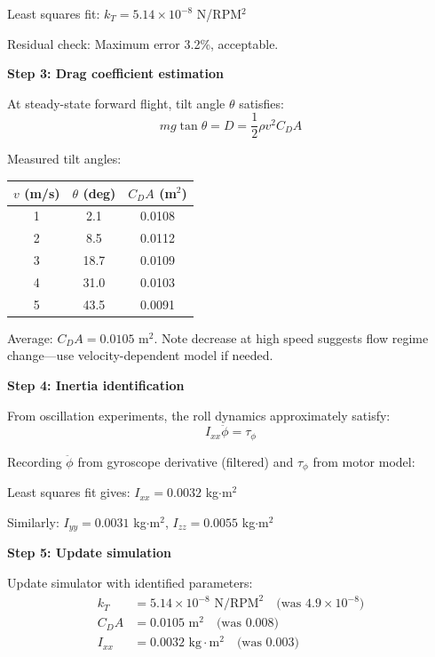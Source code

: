 \begin{example}
Least squares fit: $k_T = 5.14 \times 10^{-8}$ N/RPM$^2$

Residual check: Maximum error 3.2\%, acceptable.

\textbf{Step 3: Drag coefficient estimation}

At steady-state forward flight, tilt angle $\theta$ satisfies:
\begin{equation}
mg \tan\theta = D = \frac{1}{2}\rho v^2 C_D A
\end{equation}

Measured tilt angles:
\begin{center}
\begin{tabular}{ccc}
\toprule
$v$ (m/s) & $\theta$ (deg) & $C_D A$ (m$^2$) \\
\midrule
1 & 2.1 & 0.0108 \\
2 & 8.5 & 0.0112 \\
3 & 18.7 & 0.0109 \\
4 & 31.0 & 0.0103 \\
5 & 43.5 & 0.0091 \\
\bottomrule
\end{tabular}
\end{center}

Average: $C_D A = 0.0105$ m$^2$. Note decrease at high speed suggests flow regime change---use velocity-dependent model if needed.

\textbf{Step 4: Inertia identification}

From oscillation experiments, the roll dynamics approximately satisfy:
\begin{equation}
I_{xx} \ddot{\phi} = \tau_\phi
\end{equation}

Recording $\ddot{\phi}$ from gyroscope derivative (filtered) and $\tau_\phi$ from motor model:

Least squares fit gives: $I_{xx} = 0.0032$ kg$\cdot$m$^2$

Similarly: $I_{yy} = 0.0031$ kg$\cdot$m$^2$, $I_{zz} = 0.0055$ kg$\cdot$m$^2$

\textbf{Step 5: Update simulation}

Update simulator with identified parameters:
\begin{align}
k_T &= 5.14 \times 10^{-8} \text{ N/RPM}^2 \quad \text{(was } 4.9 \times 10^{-8}\text{)} \\
C_D A &= 0.0105 \text{ m}^2 \quad \text{(was } 0.008\text{)} \\
I_{xx} &= 0.0032 \text{ kg}\cdot\text{m}^2 \quad \text{(was } 0.003\text{)}
\end{align}


\end{example}
